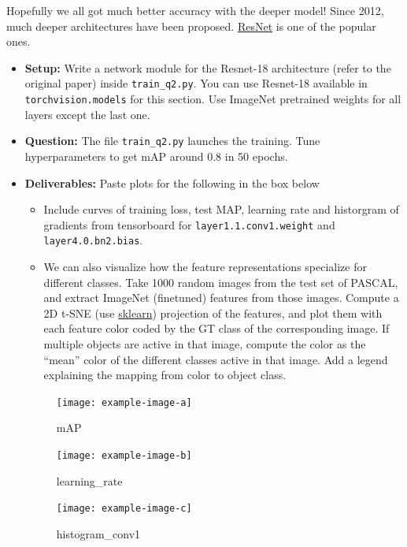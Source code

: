 \documentclass[11pt,addpoints,answers]{exam}
\numberwithin{equation}{section} %
\numberwithin{figure}{section} %
\numberwithin{table}{section} %
\begin{document}
Hopefully we all got much better accuracy with the deeper model! Since 2012, much deeper architectures have been proposed. \href{https://arxiv.org/abs/1512.03385}{ResNet} is one of the popular ones.

\begin{itemize}
    \item \textbf{Setup:} Write a network module for the Resnet-18 architecture (refer to the original paper) inside \texttt{train\_q2.py}. You can use Resnet-18 available in \texttt{torchvision.models} for this section.  Use ImageNet pretrained weights for all layers except the last one. 
    \item \textbf{Question:} The file \texttt{train\_q2.py} launches the training. Tune hyperparameters to get mAP around 0.8 in 50 epochs.
    \item \textbf{Deliverables:} Paste plots for the following in the box below
    \begin{itemize}
        \item Include curves of training loss, test MAP, learning rate and historgram of gradients from tensorboard for \texttt{layer1.1.conv1.weight} and \texttt{layer4.0.bn2.bias}. 
        \item We can also visualize how the feature representations specialize for different classes. Take 1000 random images from the test set of PASCAL, and extract ImageNet (finetuned) features from those images. Compute a 2D t-SNE (use \href{https://scikit-learn.org/stable/modules/generated/sklearn.manifold.TSNE.html}{sklearn}) projection of the features, and plot them with each feature color coded by the GT class of the corresponding image. If multiple objects are active in that image, compute the color as the ``mean” color of the different classes active in that image. Add a legend explaining the mapping from color to object class. 
    \end{itemize}

\begin{figure}[H]
\centering
\texttt{[image: example-image-a]}
\caption{mAP}
\label{fig:q2_map}
\end{figure}

\begin{figure}[H]
\centering
\texttt{[image: example-image-b]}
\caption{learning\_rate}
\label{fig:q2_learning_rate}
\end{figure}

\begin{figure}[H]
\centering
\texttt{[image: example-image-c]}
\caption{histogram\_conv1}
\label{fig:q2_histogram_conv1}
\end{figure}


\end{itemize}
\end{document}
